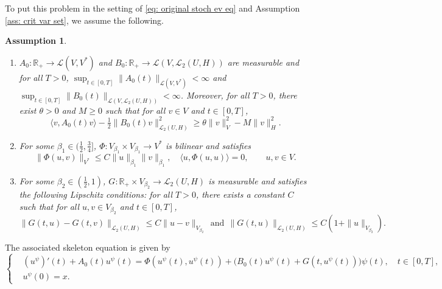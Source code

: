\documentclass{amsart}
\newcommand{\lb}{\langle}
\newcommand{\rb}{\rangle}
\newcommand{\calL}{{\mathcal L}}
\newcommand{\<}{\langle}
\newcommand{\?}{\rangle}
\theoremstyle{plain}
\theoremstyle{remark}
\theoremstyle{plain}
\newtheorem{assumption}[theorem]{Assumption}
\numberwithin{equation}{section}
\def\R{{\mathbb R}}
\begin{document}
To put this problem in the setting of \eqref{eq: original stoch ev eq} and Assumption \ref{ass: crit var set}, we assume the following. 
\begin{assumption}\label{ass:bilinearFluid}
\
\begin{enumerate}
\item\label{it1:bilinearFluid} $A_0\colon\R_+\to \calL(V, V^*)$ and $B_0\colon\R_+\to \calL(V,\calL_2(U,H))$ are measurable and for all $T>0$, $\sup_{t\in[0,T]}\|A_0(t)\|_{\calL(V, V^*)}<\infty$ and $\sup_{t\in[0,T]}\|B_0(t)\|_{\calL(V, \calL_2(U,H))}<\infty$. Moreover, for all $T>0$, there exist $\theta>0$ and $M\geq 0$ such that for all $v\in V$  and $t\in [0,T]$, 
    \[\lb v, A_0(t)v\rb  - \tfrac{1}{2} \|B_0(t) v\|_{\calL_2(U,H)}^2 \geq \theta\|v\|_V^2- M \|v\|_H^2.\]

\item\label{it2:bilinearFluid} For some $\beta_1\in(\frac{1}{2},\frac{3}{4}]$, $\Phi\colon V_{\beta_1}\times V_{\beta_1}\to V^*$ is bilinear and satisfies
\[\|\Phi(u, v)\|_{V^*}\leq C\|u\|_{\beta_1} \|v\|_{\beta_1}, \quad \lb u,\Phi(u,u)\rb = 0, \qquad u,v\in V.\]

\item\label{it3:bilinearFluid} For some $\beta_2\in (\frac12, 1)$, $G\colon\R_+\times V_{\beta_2}\to \calL_2(U,H)$  is measurable and satisfies the following Lipschitz conditions: for all $T>0$, there exists a constant $C$ such that for all $u,v\in V_{\beta_2}$ and $t\in [0,T]$, 
    \[\|G(t,u) - G(t,v)\|_{\calL_2(U,H)}\leq C \|u-v\|_{V_{\beta_2}}  \ \ \text{and} \ \ \|G(t,u)\|_{\calL_2(U,H)}\leq C(1+\|u\|_{V_{\beta_2}}).\]
\end{enumerate}
\end{assumption}


The associated skeleton equation is given by
\begin{equation}\label{eq: skeleton eqfluid}
  \begin{cases}
  &(u^\psi)'(t) + A_0(t) u^\psi(t) = \Phi(u^{\psi}(t), u^{\psi}(t)) + \big(B_0(t)u^\psi(t) + G(t,u^\psi(t)) \big)\psi(t), \quad t\in[0,T],\\
  &u^\psi(0)=x.
\end{cases}
\end{equation}
\end{document}
